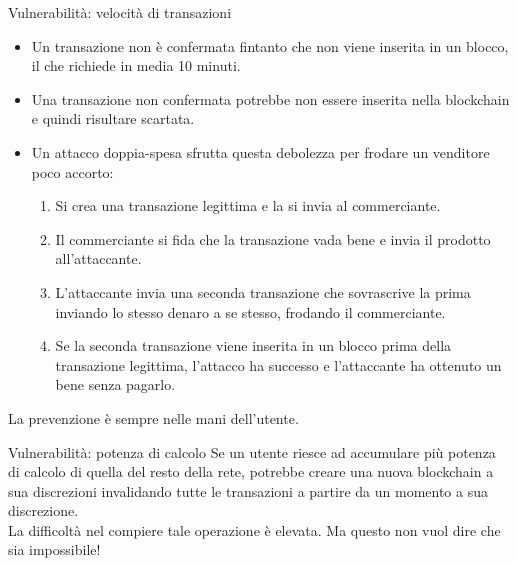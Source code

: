 \documentclass[italian]{beamer}
\begin{document}
\begin{frame}{Vulnerabilità: velocità di transazioni}
 \begin{itemize}
  \item Un transazione non è confermata fintanto che non viene inserita in un blocco, il che richiede in media 10 minuti.
  \item Una transazione non confermata potrebbe non essere inserita nella blockchain e quindi risultare scartata.
  \item Un attacco doppia-spesa sfrutta questa debolezza per frodare un venditore poco accorto: \pause
  \begin{enumerate}
   \item Si crea una transazione legittima e la si invia al commerciante. \pause
   \item Il commerciante si fida che la transazione vada bene e invia il prodotto all'attaccante. \pause
   \item L'attaccante invia una seconda transazione che sovrascrive la prima inviando lo stesso denaro a se stesso, frodando il commerciante. \pause
   \item Se la seconda transazione viene inserita in un blocco prima della transazione legittima, l'attacco ha successo e l'attaccante ha ottenuto un bene senza pagarlo.
  \end{enumerate}
 \end{itemize}
 \pause
 La prevenzione è sempre nelle mani dell'utente.
\end{frame}

\begin{frame}{Vulnerabilità: potenza di calcolo}
 Se un utente riesce ad accumulare più potenza di calcolo di quella del resto della rete, potrebbe creare una nuova blockchain a sua discrezioni invalidando tutte le transazioni a partire da un momento a sua discrezione.\\
 \bigskip
 \pause
 La difficoltà nel compiere tale operazione è elevata.
 \bigskip
 \pause
 Ma questo non vuol dire che sia impossibile!
\end{frame}
\end{document}
